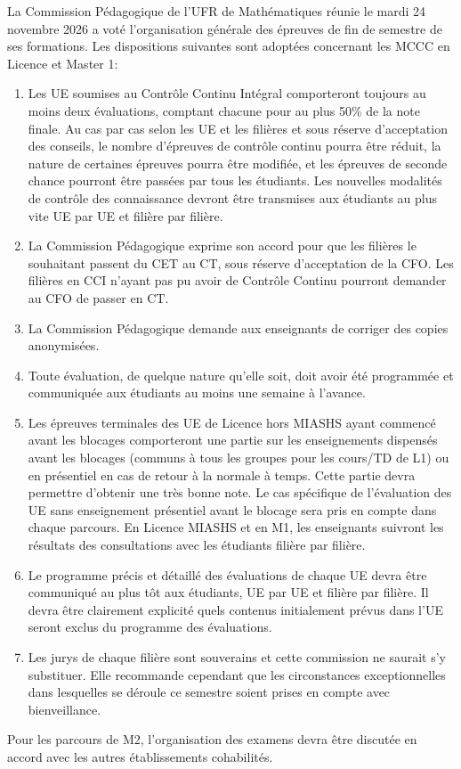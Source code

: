 \documentclass{article}
\begin{document}
\noindent La Commission Pédagogique de l'UFR de Mathématiques réunie le mardi 24 novembre 2026 a voté l'organisation générale des épreuves de fin de semestre de ses formations. Les dispositions suivantes sont adoptées concernant les MCCC en Licence et Master 1:

\begin{enumerate}
    \item Les UE soumises au Contrôle Continu Intégral comporteront toujours au moins deux évaluations, comptant chacune pour au plus 50\% de la note finale. Au cas par cas selon les UE et les filières et sous réserve d'acceptation des conseils, le nombre d'épreuves de contrôle continu pourra être réduit, la nature de certaines épreuves pourra être modifiée, et les épreuves de seconde chance pourront être passées par tous les étudiants. Les nouvelles modalités de contrôle des connaissance devront être transmises aux étudiants au plus vite UE par UE et filière par filière.

    \item La Commission Pédagogique exprime son accord pour que les filières le souhaitant passent du CET au CT, sous réserve d'acceptation de la CFO. Les filières en CCI n'ayant pas pu avoir de Contrôle Continu pourront demander au CFO de passer en CT.

    \item La Commission Pédagogique demande aux enseignants de corriger des copies anonymisées.

    \item Toute évaluation, de quelque nature qu'elle soit, doit avoir été programmée et communiquée aux étudiants au moins une semaine à l'avance.

    \item Les épreuves terminales des UE de Licence hors MIASHS ayant commencé avant les blocages comporteront une partie sur les enseignements dispensés avant les blocages (communs à tous les groupes pour les cours/TD de L1) ou en présentiel en cas de retour à la normale à temps. Cette partie devra permettre d'obtenir une très bonne note. Le cas spécifique de l'évaluation des UE sans enseignement présentiel avant le blocage sera pris en compte dans chaque parcours. En Licence MIASHS et en M1, les enseignants suivront les résultats des consultations avec les étudiants filière par filière.

    \item Le programme précis et détaillé des évaluations de chaque UE devra être communiqué au plus tôt aux étudiants, UE par UE et filière par filière. Il devra être clairement explicité quels contenus initialement prévus dans l'UE seront exclus du programme des évaluations.

    \item Les jurys de chaque filière sont souverains et cette commission ne saurait s'y substituer. Elle recommande cependant que les circonstances exceptionnelles dans lesquelles se déroule ce semestre soient prises en compte avec bienveillance.
\end{enumerate}

Pour les parcours de M2, l'organisation des examens devra être discutée en accord avec les autres établissements cohabilités.
\end{document}
